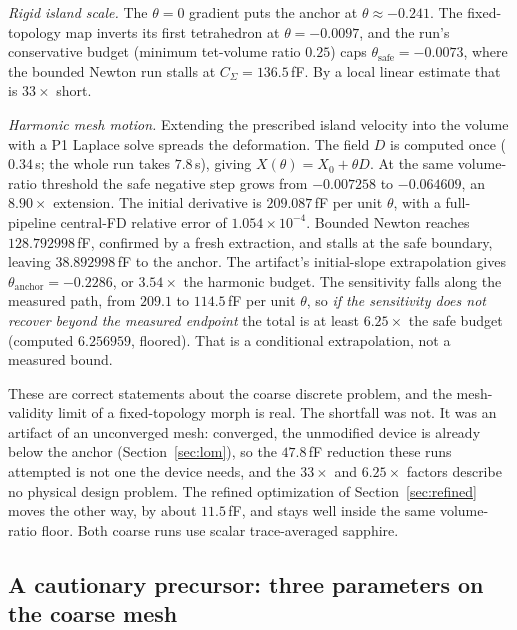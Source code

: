 \documentclass{anvil-paper}
\begin{document}
\emph{Rigid island scale.} The $\theta = 0$ gradient puts the anchor at
$\theta \approx -0.241$. The fixed-topology map inverts its first
tetrahedron at $\theta = -0.0097$, and the run's conservative budget
(minimum tet-volume ratio $0.25$) caps
$\theta_{\mathrm{safe}} = -0.0073$, where the bounded Newton run stalls
at $C_\Sigma = 136.5$\,fF. By a local linear estimate that is
$33\times$ short.

\emph{Harmonic mesh motion.} Extending the prescribed island velocity
into the volume with a P1 Laplace solve spreads the deformation. The
field $D$ is computed once ($0.34$\,s; the whole run takes $7.8$\,s),
giving $X(\theta)=X_0+\theta D$. At the same volume-ratio threshold the
safe negative step grows from $-0.007258$ to $-0.064609$, an
$8.90\times$ extension. The initial derivative is $209.087$\,fF per
unit $\theta$, with a full-pipeline central-FD relative error of
$1.054\times10^{-4}$. Bounded Newton reaches $128.792998$\,fF,
confirmed by a fresh extraction, and stalls at the safe boundary,
leaving $38.892998$\,fF to the anchor. The artifact's initial-slope
extrapolation gives $\theta_{\mathrm{anchor}}=-0.2286$, or $3.54\times$
the harmonic budget. The sensitivity falls along the measured path,
from $209.1$ to $114.5$\,fF per unit $\theta$, so \emph{if the
sensitivity does not recover beyond the measured endpoint} the total
is at least $6.25\times$ the safe budget (computed $6.256959$,
floored). That is a conditional extrapolation, not a measured bound.

These are correct statements about the coarse discrete problem, and the
mesh-validity limit of a fixed-topology morph is real. The shortfall
was not. It was an artifact of an unconverged mesh: converged, the
unmodified device is already below the anchor (Section~\ref{sec:lom}),
so the $47.8$\,fF reduction these runs attempted is not one the device
needs, and the $33\times$ and $6.25\times$ factors describe no physical
design problem. The refined optimization of Section~\ref{sec:refined}
moves the other way, by about $11.5$\,fF, and stays well inside the
same volume-ratio floor. Both coarse runs use scalar trace-averaged
sapphire.

\subsection{A cautionary precursor: three parameters on the coarse mesh}
\label{sec:multiparam}
\end{document}
